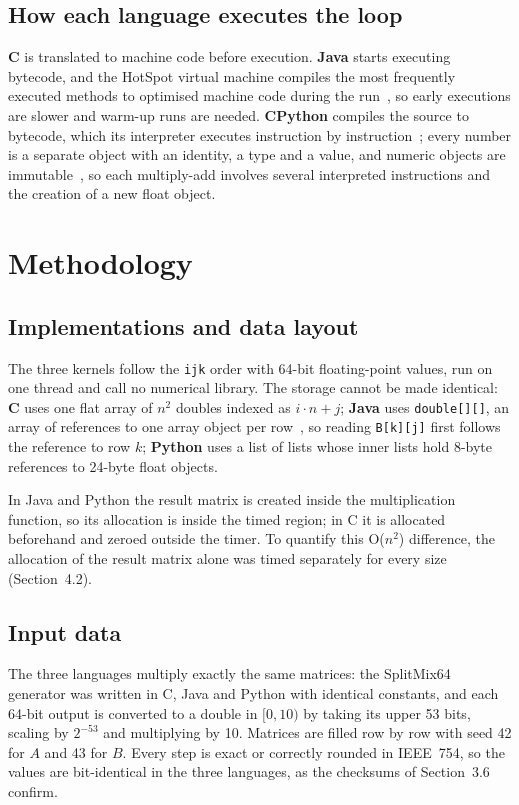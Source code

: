 \documentclass[12pt,a4paper]{article}
\begin{document}
\subsection{How each language executes the loop}

\textbf{C} is translated to machine code before execution. \textbf{Java} starts
executing bytecode, and the HotSpot virtual machine compiles the most frequently executed
methods to optimised machine code during the run~\cite{oraclejvm}, so early executions
are slower and warm-up runs are needed. \textbf{CPython} compiles the source to
bytecode, which its interpreter executes instruction by instruction~\cite{pydis}; every
number is a separate object with an identity, a type and a value, and numeric objects
are immutable~\cite{pydatamodel}, so each multiply-add involves several interpreted
instructions and the creation of a new float object.

\section{Methodology}

\subsection{Implementations and data layout}

The three kernels follow the \texttt{ijk} order with 64-bit floating-point values, run
on one thread and call no numerical library. The storage cannot be made identical:
\textbf{C} uses one flat array of $n^2$ doubles indexed as $i \cdot n + j$;
\textbf{Java} uses \texttt{double[][]}, an array of references to one array object per
row~\cite{jls21}, so reading \texttt{B[k][j]} first follows the reference to row $k$;
\textbf{Python} uses a list of lists whose inner lists hold 8-byte references to 24-byte
float objects.

In Java and Python the result matrix is created inside the multiplication function, so
its allocation is inside the timed region; in C it is allocated beforehand and zeroed
outside the timer. To quantify this O($n^2$) difference, the allocation of the result
matrix alone was timed separately for every size (Section~4.2).

\subsection{Input data}

The three languages multiply exactly the same matrices: the SplitMix64 generator was
written in C, Java and Python with identical constants, and each 64-bit output is
converted to a double in $[0, 10)$ by taking its upper 53 bits, scaling by $2^{-53}$ and
multiplying by 10. Matrices are filled row by row with seed 42 for $A$ and 43 for $B$.
Every step is exact or correctly rounded in IEEE~754, so the values are bit-identical in
the three languages, as the checksums of Section~3.6 confirm.
\end{document}
